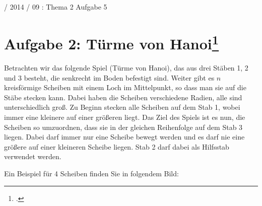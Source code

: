 \documentclass{lehramt-informatik-haupt}
\begin{document}
%

 / 2014 / 09 : Thema 2 Aufgabe 5

%

\section{Aufgabe 2: Türme von Hanoi\footcite{aud:ab:7}}

Betrachten wir das folgende Spiel (Türme von Hanoi), das aus drei Stäben
1, 2 und 3 besteht, die senkrecht im Boden befestigt sind. Weiter gibt
es $n$ kreisförmige Scheiben mit einem Loch im Mittelpunkt, so dass man
sie auf die Stäbe stecken kann. Dabei haben die Scheiben verschiedene
Radien, alle sind unterschiedlich groß. Zu Beginn stecken alle Scheiben
auf dem Stab 1, wobei immer eine kleinere auf einer größeren liegt. Das
Ziel des Spiels ist es nun, die Scheiben so umzuordnen, dass sie in der
gleichen Reihenfolge auf dem Stab 3 liegen. Dabei darf immer nur eine
Scheibe bewegt werden und es darf nie eine größere auf einer kleineren
Scheibe liegen. Stab 2 darf dabei als Hilfsstab verwendet werden.

Ein Beispiel für 4 Scheiben finden Sie in folgendem Bild:
\end{document}
